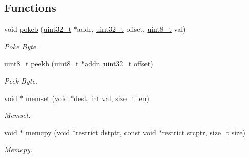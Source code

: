 \subsection*{Functions}
\begin{DoxyCompactItemize}
\item 
void \hyperlink{a00101_aa291c9926b84df379482632e80ec7c47_aa291c9926b84df379482632e80ec7c47}{pokeb} (\hyperlink{a00104_a435d1572bf3f880d55459d9805097f62_a435d1572bf3f880d55459d9805097f62}{uint32\+\_\+t} $\ast$addr, \hyperlink{a00104_a435d1572bf3f880d55459d9805097f62_a435d1572bf3f880d55459d9805097f62}{uint32\+\_\+t} offset, \hyperlink{a00104_aba7bc1797add20fe3efdf37ced1182c5_aba7bc1797add20fe3efdf37ced1182c5}{uint8\+\_\+t} val)
\begin{DoxyCompactList}\small\item\em Poke Byte. \end{DoxyCompactList}\item 
\hyperlink{a00104_aba7bc1797add20fe3efdf37ced1182c5_aba7bc1797add20fe3efdf37ced1182c5}{uint8\+\_\+t} \hyperlink{a00101_a353956c1fd65c7ed787836534fc9354e_a353956c1fd65c7ed787836534fc9354e}{peekb} (\hyperlink{a00104_aba7bc1797add20fe3efdf37ced1182c5_aba7bc1797add20fe3efdf37ced1182c5}{uint8\+\_\+t} $\ast$addr, \hyperlink{a00104_a435d1572bf3f880d55459d9805097f62_a435d1572bf3f880d55459d9805097f62}{uint32\+\_\+t} offset)
\begin{DoxyCompactList}\small\item\em Peek Byte. \end{DoxyCompactList}\item 
void $\ast$ \hyperlink{a00101_a9e432f267691eceb2e2e0efcc37efbc9_a9e432f267691eceb2e2e0efcc37efbc9}{memset} (void $\ast$dest, int val, \hyperlink{a00104_a29d85914ddff32967d85ada69854206d_a29d85914ddff32967d85ada69854206d}{size\+\_\+t} len)
\begin{DoxyCompactList}\small\item\em Memset. \end{DoxyCompactList}\item 
void $\ast$ \hyperlink{a00101_a113a42d20ee587a79f71464089007387_a113a42d20ee587a79f71464089007387}{memcpy} (void $\ast$restrict dstptr, const void $\ast$restrict srcptr, \hyperlink{a00104_a29d85914ddff32967d85ada69854206d_a29d85914ddff32967d85ada69854206d}{size\+\_\+t} size)
\begin{DoxyCompactList}\small\item\em Memcpy. \end{DoxyCompactList}\end{DoxyCompactItemize}


